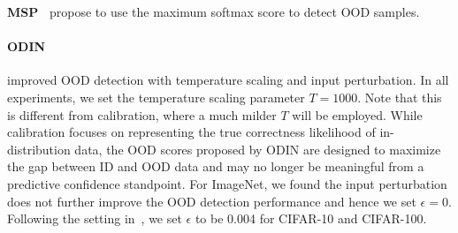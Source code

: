 \documentclass{article}
\begin{document}



\textbf{MSP~\cite{hendrycks2016baseline}} propose to use the maximum softmax score to detect OOD samples.


\paragraph{ODIN~\cite{liang2018enhancing}} \citeauthor{liang2018enhancing} improved OOD detection with temperature scaling and input perturbation. In all experiments, we set the temperature scaling parameter $T = 1000$. Note that this is different from calibration, where a much milder $T$ will be employed. While calibration focuses on representing the
true correctness likelihood of in-distribution data, the OOD scores proposed by ODIN are designed to maximize the gap between ID and OOD data and may no longer be meaningful from a predictive confidence standpoint.
For ImageNet, we found the input perturbation does not further improve the OOD detection performance and hence we set $\epsilon=0$. 
Following the setting in~\cite{liang2018enhancing}, we set $\epsilon$ to be 0.004 for CIFAR-10 and CIFAR-100.
\end{document}
